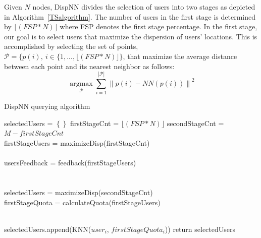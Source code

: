 \documentclass{acm_proc_article-sp}
\newcommand\floor[1]{\lfloor#1\rfloor}
\DeclareMathOperator*{\argmax}{argmax}
\newcommand{\norm}[1]{\left\lVert #1 \right\rVert}
\begin{document}
Given $N$ nodes, DispNN divides the selection of users into two stages as depicted in Algorithm~\ref{TSalgorithm}. The number of users in the first stage is determined by $\floor{(FSP*N)}$ where FSP denotes the first stage percentage.
 In the first stage, our goal is to select users that maximize the dispersion of users' locations. This is accomplished by selecting the set of points, $\mathcal{P} = \{ p(i), \ i \in \{ 1,..., \floor{(FSP*N)} \}$, that maximize the average distance between each point and its nearest neighbor as follows:
\begin{equation} \label{eq:maxDisp}
\argmax\limits_{\mathcal{P}} \sum_{i=1}^{|\mathcal{P} |} \norm{p(i) - NN(p(i))}^2
\end{equation}
\begin{algorithm}
\caption{DispNN querying algorithm}
\label{TSalgorithm}
\begin{algorithmic}[1]
        \State selectedUsers = $\left\{\right\}$ 
        \State firstStageCnt = $\floor{(FSP*N)}$
        \State secondStageCnt = $M - firstStageCnt$\\
       
        \State firstStageUsers = maximizeDisp(firstStageCnt)\\
        \\
        \State usersFeedback = feedback(firstStageUsers)\\
         \\
        \\
          
               \State selectedUsers = maximizeDisp(secondStageCnt){}
        \Else
        \EndIf {}\\
      \State firstStageQuota = calculateQuota(firstStageUsers)
      
      \\ 
    \State selectedUsers.append(KNN($user_i$, $firstStageQuota_i$))
  \EndFor
\State return {selectedUsers}
\EndFunction
\end{algorithmic}
\end{algorithm}
\end{document}
